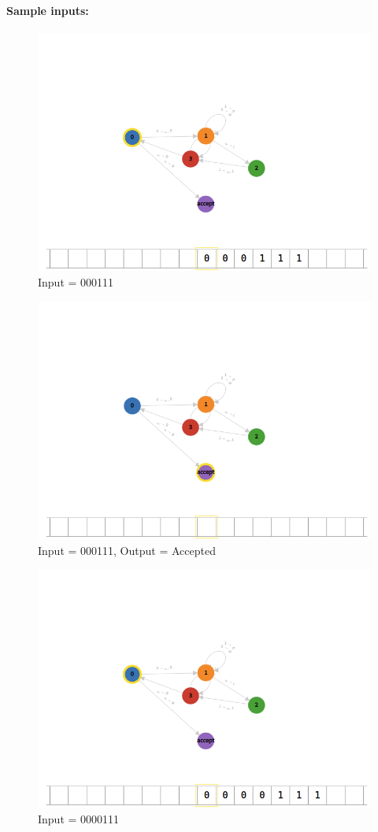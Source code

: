 \documentclass[12pt]{article}
\begin{document}
\newpage
\paragraph{Sample inputs:\\}
\begin{figure}[bp!]
    \caption{Input = 000111}
    \centering
    \includegraphics[width=12cm]{Q1/000111.png}    
\end{figure}
\begin{figure}[bp!]
    \caption{Input = 000111, Output = Accepted}
    \centering
    \includegraphics[width=12cm]{Q1/000111o.png}    
\end{figure}
\begin{figure}[bp!]
    \caption{Input = 0000111}
    \centering
    \includegraphics[width=12cm]{Q1/0000111.png}    
\end{figure}
\end{document}
